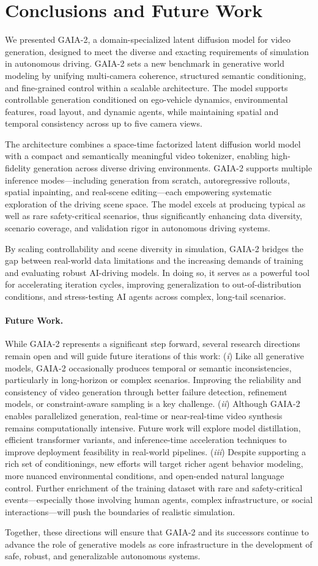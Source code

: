 
\section{Conclusions and Future Work}
\label{section:conclusion}
We presented GAIA-2, a domain-specialized latent diffusion model for video generation, designed to meet the diverse and exacting requirements of simulation in autonomous driving. GAIA-2 sets a new benchmark in generative world modeling by unifying multi-camera coherence, structured semantic conditioning, and fine-grained control within a scalable architecture. The model supports controllable generation conditioned on ego-vehicle dynamics, environmental features, road layout, and dynamic agents, while maintaining spatial and temporal consistency across up to five camera views.

The architecture combines a space-time factorized latent diffusion world model with a compact and semantically meaningful video tokenizer, enabling high-fidelity generation across diverse driving environments. GAIA-2 supports multiple inference modes—including generation from scratch, autoregressive rollouts, spatial inpainting, and real-scene editing—each empowering systematic exploration of the driving scene space. The model excels at producing typical as well as rare safety-critical scenarios, thus significantly enhancing data diversity, scenario coverage, and validation rigor in autonomous driving systems.

By scaling controllability and scene diversity in simulation, GAIA-2 bridges the gap between real-world data limitations and the increasing demands of training and evaluating robust AI-driving models. In doing so, it serves as a powerful tool for accelerating iteration cycles, improving generalization to out-of-distribution conditions, and stress-testing AI agents across complex, long-tail scenarios.

\paragraph{Future Work.}
While GAIA-2 represents a significant step forward, several research directions remain open and will guide future iterations of this work: (\textit{i}) Like all generative models, GAIA-2 occasionally produces temporal or semantic inconsistencies, particularly in long-horizon or complex scenarios. Improving the reliability and consistency of video generation through better failure detection, refinement models, or constraint-aware sampling is a key challenge.
(\textit{ii}) Although GAIA-2 enables parallelized generation, real-time or near-real-time video synthesis remains computationally intensive. Future work will explore model distillation, efficient transformer variants, and inference-time acceleration techniques to improve deployment feasibility in real-world pipelines. 
(\textit{iii}) Despite supporting a rich set of conditionings, new efforts will target richer agent behavior modeling, more nuanced environmental conditions, and open-ended natural language control. Further enrichment of the training dataset with rare and safety-critical events—especially those involving human agents, complex infrastructure, or social interactions—will push the boundaries of realistic simulation.

Together, these directions will ensure that GAIA-2 and its successors continue to advance the role of generative models as core infrastructure in the development of safe, robust, and generalizable autonomous systems.

